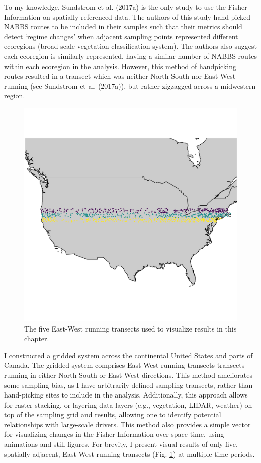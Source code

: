 \documentclass[12pt,twoside,openany]{reedthesis}
\begin{document}
To my knowledge, Sundstrom et al. (2017a) is the only study to use the
Fisher Information on spatially-referenced data. The authors of this
study hand-picked NABBS routes to be included in their samples such that
their metrics should detect `regime changes' when adjacent sampling
points represented different ecoregions (broad-scale vegetation
classification system). The authors also suggest each ecoregion is
similarly represented, having a similar number of NABBS routes within
each ecoregion in the analysis. However, this method of handpicking
routes resulted in a transect which was neither North-South nor
East-West running (see Sundstrom et al. (2017a)), but rather zigzagged
across a midwestern region.
\begin{figure}

{\centering \includegraphics[width=0.95\linewidth]{./chapterFiles/fisherSpatial/figures/figsCalledInDiss/transectSamplingALlRoutesUsed} 

}

\caption{The five East-West running transects used to visualize results in this chapter.}\label{fig:ewRoutesUsedHere}
\end{figure}
I constructed a gridded system across the continental United States and
parts of Canada. The gridded system comprises East-West running
transects transects running in either North-South or East-West
directions. This method ameliorates some sampling bias, as I have
arbitrarily defined sampling transects, rather than hand-picking sites
to include in the analysis. Additionally, this approach allows for
raster stacking, or layering data layers (e.g., vegetation, LIDAR,
weather) on top of the sampling grid and results, allowing one to
identify potential relationships with large-scale drivers. This method
also provides a simple vector for visualizing changes in the Fisher
Information over space-time, using animations and still figures. For
brevity, I present visual results of only five, spatially-adjacent,
East-West running transects (Fig. \ref{fig:ewRoutesUsedHere}) at
multiple time periods.
\end{document}
